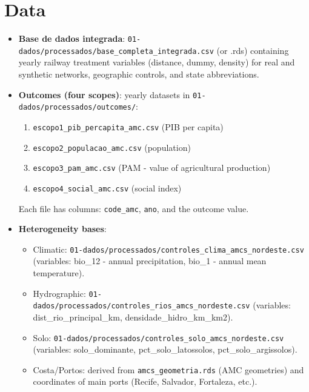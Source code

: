 \documentclass{article}
\begin{document}
\section{Data}
\begin{itemize}
\item \textbf{Base de dados integrada}: \texttt{01-dados/processados/base\_completa\_integrada.csv} (or .rds) containing yearly railway treatment variables (distance, dummy, density) for real and synthetic networks, geographic controls, and state abbreviations.
\item \textbf{Outcomes (four scopes)}: yearly datasets in \texttt{01-dados/processados/outcomes/}:
  \begin{enumerate}
  \item \texttt{escopo1\_pib\_percapita\_amc.csv} (PIB per capita)
  \item \texttt{escopo2\_populacao\_amc.csv} (population)
  \item \texttt{escopo3\_pam\_amc.csv} (PAM - value of agricultural production)
  \item \texttt{escopo4\_social\_amc.csv} (social index)
  \end{enumerate}
  Each file has columns: \texttt{code\_amc}, \texttt{ano}, and the outcome value.
\item \textbf{Heterogeneity bases}:
  \begin{itemize}
  \item Climatic: \texttt{01-dados/processados/controles\_clima\_amcs\_nordeste.csv} (variables: bio\_12 - annual precipitation, bio\_1 - annual mean temperature).
  \item Hydrographic: \texttt{01-dados/processados/controles\_rios\_amcs\_nordeste.csv} (variables: dist\_rio\_principal\_km, densidade\_hidro\_km\_km2).
  \item Solo: \texttt{01-dados/processados/controles\_solo\_amcs\_nordeste.csv} (variables: solo\_dominante, pct\_solo\_latossolos, pct\_solo\_argissolos).
  \item Costa/Portos: derived from \texttt{amcs\_geometria.rds} (AMC geometries) and coordinates of main ports (Recife, Salvador, Fortaleza, etc.).
  \end{itemize}
\end{itemize}
\end{document}
